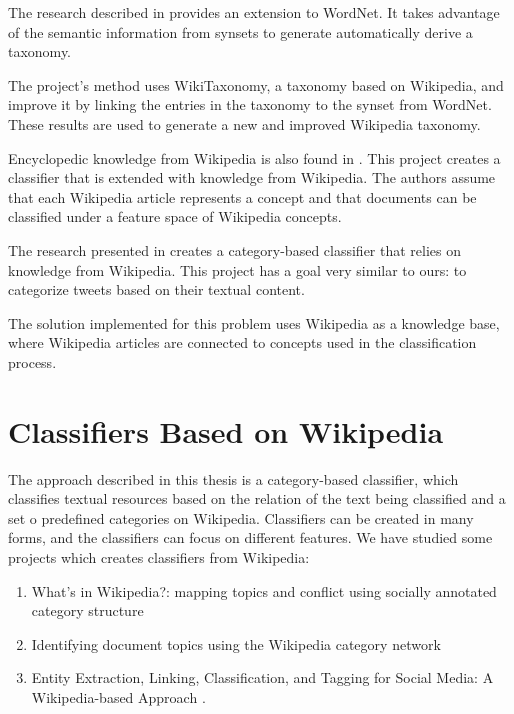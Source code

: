 The research described in \cite{ponzetto2009large} provides an extension to WordNet. It takes advantage of the semantic information from synsets to generate automatically derive a  taxonomy.

The project’s method uses WikiTaxonomy, a taxonomy based on Wikipedia, and improve it by linking the entries in the taxonomy to the synset from WordNet. These results are used to generate a new and improved Wikipedia taxonomy.

Encyclopedic knowledge from Wikipedia is also found in \cite{Gabrilovich:2006}. This project creates a classifier that is extended with knowledge from Wikipedia. The authors assume that each Wikipedia article represents a concept and that documents can be classified under a feature space of Wikipedia concepts.

The research presented in \cite{gattani2013entity} creates a category-based classifier that relies on knowledge from Wikipedia. This project has a goal very similar to ours: to categorize tweets based on their textual content.

The solution implemented for this problem uses Wikipedia as a knowledge base, where Wikipedia articles are connected to concepts used in the classification process.


\section{\hspace*{3pt}Classifiers Based on Wikipedia}

The approach described in this thesis is a category-based classifier, which classifies textual resources based on the relation of the text being classified and a set o predefined categories on Wikipedia. Classifiers can be created in many forms, and the classifiers can focus on different features. We have studied some projects which creates classifiers from Wikipedia:
\begin{enumerate}

\item What's in Wikipedia?: mapping topics and conflict using socially annotated category structure \cite{kittur2009s}
\item Identifying document topics using the Wikipedia category network \cite{schonhofen2009identifying}  
\item Entity Extraction, Linking, Classification, and Tagging for Social Media: A Wikipedia-based Approach \cite{Gabrilovich:2006}.
\end{enumerate}



